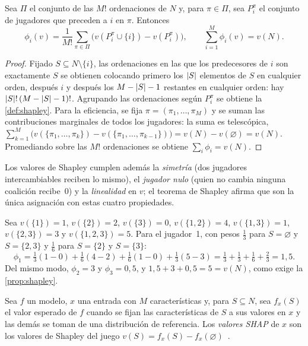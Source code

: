 \begin{proposicion}\label{prop:shapley}
Sea $\Pi$ el conjunto de las $M!$ ordenaciones de $N$ y, para $\pi\in\Pi$, sea $P_i^{\pi}$ el conjunto de jugadores que preceden a $i$ en $\pi$. Entonces
\[
\phi_i(v)=\frac{1}{M!}\sum_{\pi\in\Pi}\bigl(v(P_i^{\pi}\cup\{i\})-v(P_i^{\pi})\bigr),\qquad \sum_{i=1}^{M}\phi_i(v)=v(N).
\]
\end{proposicion}

\begin{proof}
Fijado $S\subseteq N\setminus\{i\}$, las ordenaciones en las que los predecesores de $i$ son exactamente $S$ se obtienen colocando primero los $\lvert S\rvert$ elementos de $S$ en cualquier orden, después $i$ y después los $M-\lvert S\rvert-1$ restantes en cualquier orden: hay $\lvert S\rvert!\,(M-\lvert S\rvert-1)!$. Agrupando las ordenaciones según $P_i^{\pi}$ se obtiene la \cref{def:shapley}. Para la eficiencia, se fija $\pi=(\pi_1,\dots,\pi_M)$ y se suman las contribuciones marginales de todos los jugadores: la suma es telescópica, $\sum_{k=1}^{M}\bigl(v(\{\pi_1,\dots,\pi_k\})-v(\{\pi_1,\dots,\pi_{k-1}\})\bigr)=v(N)-v(\varnothing)=v(N)$. Promediando sobre las $M!$ ordenaciones se obtiene $\sum_i\phi_i=v(N)$.
\end{proof}

Los valores de Shapley cumplen además la \emph{simetría} (dos jugadores intercambiables reciben lo mismo), el \emph{jugador nulo} (quien no cambia ninguna coalición recibe~0) y la \emph{linealidad} en $v$; el teorema de Shapley afirma que son la única asignación con estas cuatro propiedades.

\begin{ejemplo}\label{ej:shapley}
Sea $v(\{1\})=1$, $v(\{2\})=2$, $v(\{3\})=0$, $v(\{1,2\})=4$, $v(\{1,3\})=1$, $v(\{2,3\})=3$ y $v(\{1,2,3\})=5$. Para el jugador~1, con pesos $\tfrac13$ para $S=\varnothing$ y $S=\{2,3\}$ y $\tfrac16$ para $S=\{2\}$ y $S=\{3\}$:
\[
\phi_1=\tfrac13(1-0)+\tfrac16(4-2)+\tfrac16(1-0)+\tfrac13(5-3)=\tfrac13+\tfrac13+\tfrac16+\tfrac23=1{,}5.
\]
Del mismo modo, $\phi_2=3$ y $\phi_3=0{,}5$, y $1{,}5+3+0{,}5=5=v(N)$, como exige la \cref{prop:shapley}.
\end{ejemplo}

\begin{definicion}[SHAP]\label{def:shap}
Sea $f$ un modelo, $x$ una entrada con $M$ características y, para $S\subseteq N$, sea $f_x(S)$ el valor esperado de $f$ cuando se fijan las características de $S$ a sus valores en $x$ y las demás se toman de una distribución de referencia. Los \emph{valores SHAP} de $x$ son los valores de Shapley del juego $v(S)=f_x(S)-f_x(\varnothing)$~\cite[§2 y teorema~1]{lundberg}.
\end{definicion}

